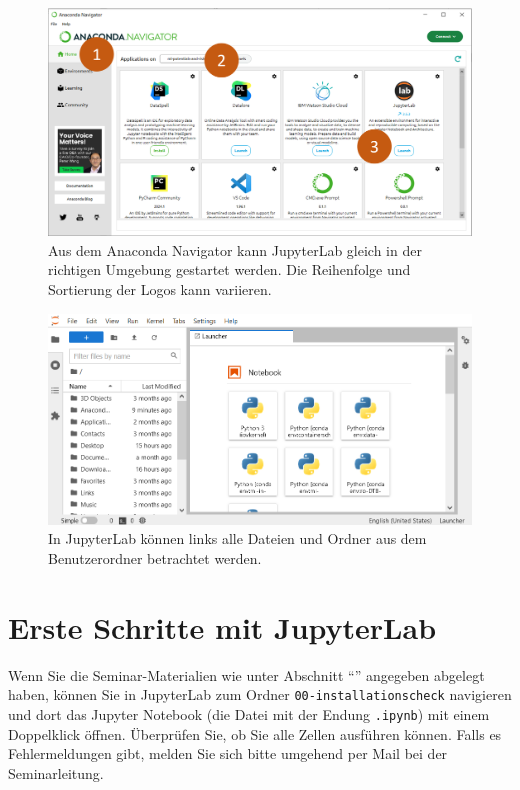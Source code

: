 \documentclass[nobib]{tufte-handout}
\begin{document}
\begin{figure}[h]
  \includegraphics[trim={0 1.5cm 0 0},clip]{anaconda-navigator-jupyterlab--mit-reihenfolge}
  \caption{Aus dem Anaconda Navigator kann JupyterLab gleich in der richtigen Umgebung gestartet werden.%
  Die Reihenfolge und Sortierung der Logos kann variieren.}%
  \label{fig:start-jupyterlab}
\end{figure}

\begin{figure}[h]
  \includegraphics{jupyterlab-running}
  \caption{In JupyterLab können links alle Dateien und Ordner aus dem Benutzerordner betrachtet werden.}%
  \label{fig:inside-jupyterlab}
\end{figure}


\section{Erste Schritte mit JupyterLab}

Wenn Sie die Seminar-Materialien wie unter Abschnitt \enquote{} angegeben abgelegt haben,
können Sie in JupyterLab zum Ordner 
\texttt{00-installationscheck}
navigieren und dort das Jupyter Notebook (die Datei mit der Endung \texttt{.ipynb}) mit einem Doppelklick öffnen.
Überprüfen Sie, ob Sie alle Zellen ausführen können.
Falls es Fehlermeldungen gibt, melden Sie sich bitte umgehend per Mail bei der Seminarleitung.
\end{document}
